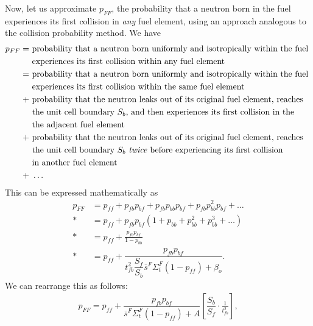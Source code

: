 Now, let us approximate $p_{FF}$, the probability that a neutron born in the fuel experiences its first collision in \emph{any} fuel element, using an approach analogous to the collision probability method. We have
\begin{align}
  p_{FF} = &\text{ probability that a neutron born uniformly and isotropically within the fuel} \nonumber \\*
           &\text{ experiences its first collision within any fuel element } \nonumber \\*
         = &\text{ probability that a neutron born uniformly and isotropically within the fuel } \nonumber \\*
           &\text{ experiences its first collision within the same fuel element } \nonumber \\*
         + &\text{ probability that the neutron leaks out of its original fuel element, reaches } \nonumber \\*
           &\text{ the unit cell boundary $S_b$, and then experiences its first collision in the } \nonumber \\*
           &\text{ the adjacent fuel element } \nonumber \\*
         + &\text{ probability that the neutron leaks out of its original fuel element, reaches } \nonumber \\*
           &\text{ the unit cell boundary $S_b$ \emph{twice} before experiencing its first collision } \nonumber \\*
           &\text{ in another fuel element } \nonumber \\*
         + &\text{ } \ldots \nonumber
\end{align}
This can be expressed mathematically as
\begin{align}
  p_{FF} 
  &= p_{ff} + p_{fb} p_{bf} + p_{fb} p_{bb} p_{bf} +  p_{fb} p_{bb}^2 p_{bf} + \ldots \nonumber \\*
  &= p_{ff} + p_{fb} p_{bf} ( 1 + p_{bb} + p_{bb}^2 + p_{bb}^3 + \ldots ) \nonumber \\*
  &= p_{ff} + \frac{ p_{fb} p_{bf} }{ 1 - p_{bb} } \nonumber \\*
  &= p_{ff} + \dfrac{ p_{fb} p_{bf} }{  t_{fb}^2 \dfrac{S_f}{S_b} \overline{s}^F \Sigma_t^F ( 1 - p_{ff} ) + \beta_o } .
\end{align}
We can rearrange this as follows:
\begin{align}
  p_{FF} = p_{ff} + \dfrac{ p_{fb} p_{bf} }{  \overline{s}^F \Sigma_t^F ( 1 - p_{ff} ) + A } \left[ \dfrac{S_b}{S_f} \cdot \frac{1}{t_{fb}^2} \right],
\end{align}
